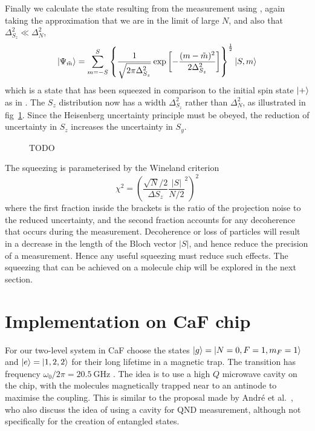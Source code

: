 Finally we calculate the state resulting from the measurement using
, again taking the
approximation that we are in the limit of large $N$, and also that
$\Delta_{S_z}^2 \ll \Delta_N^2$,
%
\begin{equation}
  \ket{\Psi_{\tilde{m}}} =
  \sum_{m=-S}^S\left\{\frac{1}{\sqrt{2\pi\Delta_{S_z}^2}} \exp\left[-\frac{(m -
  \tilde{m})^2}{2\Delta_{S_z}^2}\right]\right\}^\frac{1}{2} \ket{S,m}
\end{equation}
%
which is a state that has been squeezed in comparison to the initial spin state
$\ket{+}$ as in . The $S_z$ distribution now has
a width $\Delta_{S_z}^2$ rather than $\Delta_N^2$, as illustrated in
fig~\ref{squeeze:fig:blochsqueezed}. Since the Heisenberg uncertainty principle
must be obeyed, the reduction of uncertainty in $S_z$ increases the uncertainty
in $S_y$.

\begin{figure}
  \centering
  \caption{TODO}
  \label{squeeze:fig:blochsqueezed}
\end{figure}

The squeezing is parameterised by the Wineland criterion~\cite{}
%
\begin{equation}
  \chi^2 = \left(\frac{\sqrt{N}/2}{\Delta S_z}\frac{|S|}{N/2}^2\right)^2
\end{equation}
%
where the first fraction inside the brackets is the ratio of the projection
noise to the reduced uncertainty, and the second fraction accounts for any
decoherence that occurs during the measurement. Decoherence or loss of
particles will result in a decrease in the length of the Bloch vector $|S|$,
and hence reduce the precision of a measurement. Hence any useful squeezing
must reduce such effects. The squeezing that can be achieved on a \CaF{}
molecule chip will be explored in the next section.

\section{Implementation on CaF chip}

For our two-level system in CaF choose the states $\ket{g} = \ket{N=0, F=1,
m_F=1}$ and $\ket{e} = \ket{1, 2, 2}$ for their long lifetime in a magnetic
trap. The transition has frequency $\omega_0/2\pi = \SI{20.5}{\giga\hertz}$
\cite{WilliamsMagnetic2018}. The idea is to use a high $Q$ microwave cavity on the
chip, with the molecules magnetically trapped near to an antinode to maximise
the coupling. This is similar to the proposal made by Andr\'e et
al.~\cite{Andre2006}, who also discuss the idea of using a cavity for QND
measurement, although not specifically for the creation of entangled states.

